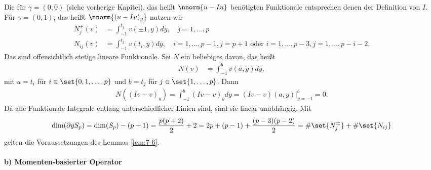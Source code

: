Die für $\gamma = (0, 0)$ (siehe vorherige Kapitel), das heißt $\nnorm{u - Iu}$ benötigten Funktionale entsprechen denen der Definition von $I$. Für $\gamma = (0, 1)$, das heißt $\nnorm{(u - Iu)_{y}}$ nutzen wir
\begin{align*}
  N_{j}^{\pm}(v) &= \int_{-1}^{t_{j}} v(\pm 1, y) dy, \quad j = 1, \dots, p\\
  N_{ij}(v) &= \int_{-1}^{t_{j}} v(t_{i}, y) dy, \quad i = 1, \dots, p-1, j = p+1 \text{ oder } i = 1, \dots, p-3, j = 1, \dots, p-i-2. 
\end{align*}
Das sind offensichtlich stetige lineare Funktionale. Sei $N$ ein beliebiges davon, das heißt
\begin{align*}
  N(v) &= \int_{-1}^{b} v(a, y) dy, 
\end{align*}
mit $a = t_{i}$ für $i \in \set{0, 1, \dots, p}$ und $b = t_{j}$ für $j \in \set{1, \dots, p}$. Dann
\begin{align*}
  N((Iv - v)_{y}) = \int_{-1}^{b} (Iv - v)_{y} dy = (Iv-v)(a, y)|_{y = -1}^{b} = 0. 
\end{align*}
Da alle Funktionale Integrale entlang unterschiedlicher Linien sind, sind sie linear unabhängig. Mit
\begin{align*}
  \dim(\partial y S_{p}) = \dim(S_{p})- (p+1) = \frac{p(p+2)}2 + 2 = 2p + (p-1) + \frac {(p-3)(p-2)}2 = \# \set{N_{j}^{\pm}} + \# \set{N_{ij}}
\end{align*}
gelten die Voraussetzungen des Lemmas \ref{lem:7-6}. 

\paragraph{b) Momenten-basierter Operator}

